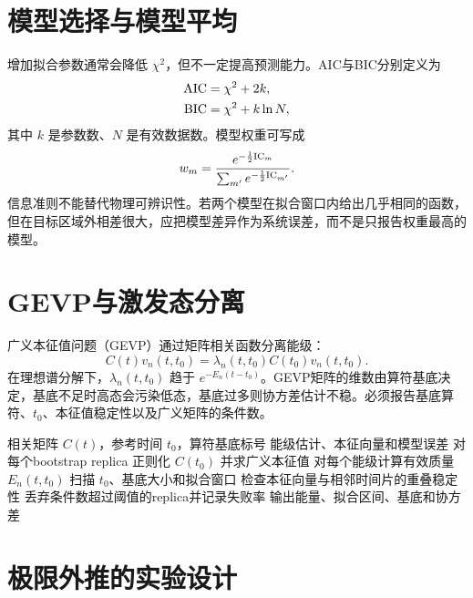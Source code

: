 \documentclass[UTF8,12pt,a4paper,twoside,openany]{ctexbook}
\begin{document}
\section{模型选择与模型平均}

增加拟合参数通常会降低 \(\chi^2\)，但不一定提高预测能力。AIC与BIC分别定义为
\begin{align}
  {\rm AIC}&=\chi^2+2k,
  \label{eq:aic}\\
  {\rm BIC}&=\chi^2+k\ln N,
  \label{eq:bic}
\end{align}
其中 \(k\) 是参数数、\(N\) 是有效数据数。模型权重可写成
\begin{equation}
  w_m=\frac{e^{-\frac12{\rm IC}_m}}
  {\sum_{m'}e^{-\frac12{\rm IC}_{m'}}}.
  \label{eq:model-weight}
\end{equation}
信息准则不能替代物理可辨识性。若两个模型在拟合窗口内给出几乎相同的函数，但在目标区域外相差很大，应把模型差异作为系统误差，而不是只报告权重最高的模型。

\section{GEVP与激发态分离}

广义本征值问题（GEVP）通过矩阵相关函数分离能级：
\begin{equation}
  C(t)v_n(t,t_0)
  =\lambda_n(t,t_0)C(t_0)v_n(t,t_0).
  \label{eq:stats-gevp}
\end{equation}
在理想谱分解下，\(\lambda_n(t,t_0)\) 趋于 \(e^{-E_n(t-t_0)}\)。GEVP矩阵的维数由算符基底决定，基底不足时高态会污染低态，基底过多则协方差估计不稳。必须报告基底算符、\(t_0\)、本征值稳定性以及广义矩阵的条件数。

\begin{algorithm}[htbp]
\caption{GeVp谱学与稳定性扫描。}
\label{alg:gevp}
\begin{algorithmic}[1]
\Require 相关矩阵 \(C(t)\)，参考时间 \(t_0\)，算符基底标号
\Ensure 能级估计、本征向量和模型误差
\State 对每个bootstrap replica 正则化 \(C(t_0)\) 并求广义本征值
\State 对每个能级计算有效质量 \(E_n(t,t_0)\)
\State 扫描 \(t_0\)、基底大小和拟合窗口
\State 检查本征向量与相邻时间片的重叠稳定性
\State 丢弃条件数超过阈值的replica并记录失败率
\State 输出能量、拟合区间、基底和协方差
\end{algorithmic}
\end{algorithm}

\section{极限外推的实验设计}
\end{document}
